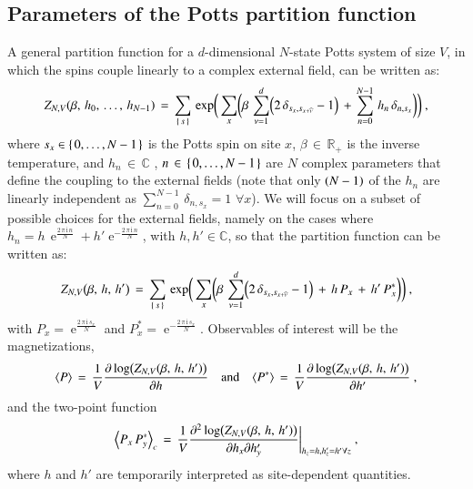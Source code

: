 \documentclass[epj]{webofc}
\let\originalleft\left
\let\originalright\right
\renewcommand{\left}{\mathopen{}\mathclose\bgroup\originalleft}
\renewcommand{\right}{\aftergroup\egroup\originalright}
\newcommand{\e}{\operatorname{e}}
\newcommand{\of}[1]{\left(#1\right)}
\newcommand{\bof}[1]{\biggl(\bigg.#1\bigg.\biggr)}
\newcommand{\cof}[1]{\left\{\right.#1\left.\right\}}
\newcommand{\avof}[1]{\left\langle #1\right\rangle}
\newcommand{\ii}{\mathrm{i}}
\newcommand{\partd}[2]{\frac{\partial #1}{\partial #2}}
\newcommand{\spartd}[3]{\frac{\partial^{2} #1}{\partial #2 \partial #3}}
\renewcommand*\[{\begin{equation}}
\renewcommand*\]{\end{equation}}
\renewcommand*\hat[1]{\widehat{#1}}
\begin{document}
\subsection{Parameters of the Potts partition function}\label{ssec:pottsparam}
A general partition function for a $d$-dimensional $N$-state Potts system of size $V$, in which the spins couple linearly to a complex external field, can be written as:
\[
Z_{N,V}\of{\beta,\,h_{0},\,\ldots,\,h_{N-1}}\,=\,\sum\limits_{\cof{s}}\,\exp\bof{\sum\limits_{x}\bof{\beta\,\sum\limits_{\nu=1}^{d}\of{2\,\delta_{s_{x},s_{x+\hat{\nu}}}-1}\,+\,\sum\limits_{n=0}^{N-1}\,h_{n}\,\delta_{n,s_{x}}}}\ ,\label{eq:pottspartfgen}
\]
where $s_{x}\in\cof{0,\ldots,N-1}$ is the Potts spin on site $x$, $\beta\,\in\,\mathbb{R}_{+}$ is the inverse temperature, and $h_{n}\,\in\,\mathbb{C}$ , $n\,\in\,\cof{0,\ldots,N-1}$ are $N$ complex parameters that define the coupling to the external fields (note that only $\of{N-1}$ of the $h_{n}$ are linearly independent as $\sum_{n=0}^{N-1}\,\delta_{n,s_{x}}=1$ $\forall x$). We will focus on a subset of possible choices for the external fields, namely on the cases where $h_{n}=h\,\e^{\frac{2\,\pi\,\ii\,n}{N}}+h'\e^{-\frac{2\,\pi\,\ii\,n}{N}}$, with $h,h'\in\mathbb{C}$, so that the partition function can be written as:
\[
Z_{N,V}\of{\beta,\,h,\,h'}\,=\,\sum\limits_{\cof{s}}\,\exp\bof{\sum\limits_{x}\bof{\beta\,\sum\limits_{\nu=1}^{d}\of{2\,\delta_{s_{x},s_{x+\hat{\nu}}}-1}\,+\,h\,P_{x}\,+\,h'\,P^{*}_{x}}}\ ,\label{eq:pottspartf0}
\]
with $P_{x}=\e^{\frac{2\,\pi\,\ii\,s_{x}}{N}}$ and $P^{*}_{x}=\e^{-\frac{2\,\pi\,\ii\,s_{x}}{N}}$. Observables of interest will be the magnetizations,
\[
\avof{P}\,=\,\frac{1}{V}\partd{\log\of{Z_{N,V}\of{\beta,\,h,\,h'}}}{h}\quad\text{and}\quad \avof{P^{*}}\,=\,\frac{1}{V}\partd{\log\of{Z_{N,V}\of{\beta,\,h,\,h'}}}{h'}\ ,\label{eq:magnetizations}
\]
and the two-point function
\[
\avof{P_{x}\,P^{*}_{y}}_{c}\,=\,\frac{1}{V}\spartd{\log\of{Z_{N,V}\of{\beta,\,h,\,h'}}}{h_{x}}{h'_{y}}\bigg|_{h_{z}=h,h'_{z}=h'\forall z}\ ,\label{eq:twopointfunc}
\]
where $h$ and $h'$ are temporarily interpreted as site-dependent quantities.  
\end{document}

